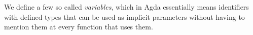 We define a few so called \textit{variables}, which in Agda essentially means identifiers with defined types that can be used as implicit parameters without having to mention them at every function that uses them.


\begin{multicols}{2}[]
    \begin{code}
        \>[2]\<%
        \\
        \>[2][@{}l@{\AgdaIndent{0}}]%
        \>[4]\AgdaSpace{}%
        \AgdaSpace{}%
        \AgdaSpace{}%
        \AgdaSpace{}%
        \AgdaSpace{}%
        \AgdaSpace{}%
        \AgdaSymbol{:}\AgdaSpace{}%
        \<%
        \\
        \>[4]\AgdaSpace{}%
        \AgdaSpace{}%
        \AgdaSymbol{:}\AgdaSpace{}%
        \<%
        \\
        \>[4]\AgdaSpace{}%
        \AgdaSpace{}%
        \AgdaSymbol{:}\AgdaSpace{}%
        \<%
        \\
        \>[4]\AgdaSpace{}%
        \AgdaSpace{}%
        \AgdaSpace{}%
        \AgdaSpace{}%
        \AgdaSymbol{:}\AgdaSpace{}%
        \<%
        \\
        \>[4]\AgdaSpace{}%
        \AgdaSymbol{:}\AgdaSpace{}%
        \<%
        \\
        \\[\AgdaEmptyExtraSkip]%
        \>[4]\AgdaSpace{}%
        \AgdaSymbol{:}\AgdaSpace{}%
        \<%
        \\
        \>[4]\AgdaSpace{}%
        \AgdaSpace{}%
        \AgdaSymbol{:}\AgdaSpace{}%
        \<%
        \\
        \>[4]\AgdaSpace{}%
        \AgdaSymbol{:}\AgdaSpace{}%
        \<%
        \\
        \>[4]\AgdaSpace{}%
        \AgdaSymbol{:}\AgdaSpace{}%
        \AgdaSpace{}%
        \<%
        \\
        \>[4]\AgdaSpace{}%
        \AgdaSymbol{:}\AgdaSpace{}%
        \<%
        \\
        \>[4]\AgdaSpace{}%
        \AgdaSymbol{:}\AgdaSpace{}%
        \<%
    \end{code}
\end{multicols}

